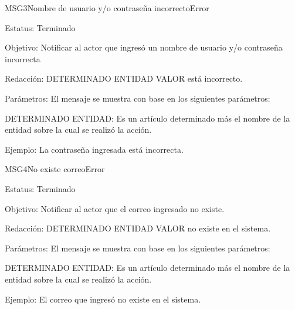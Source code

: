 \begin{mensaje}{MSG3}{Nombre de usuario y/o contraseña incorrecto}{Error}
	\item[Estatus:] Terminado
	\item[Objetivo:] Notificar al actor que ingresó un nombre de usuario y/o contraseña incorrecta
	\item[Redacción:] DETERMINADO ENTIDAD VALOR está incorrecto.
	\item[Parámetros:] El mensaje se muestra con base en los siguientes parámetros:
	\begin{Citemize}
		\item DETERMINADO ENTIDAD: Es un artículo determinado más el nombre de la entidad sobre la cual se realizó la acción.
	\end{Citemize}
	\item[Ejemplo:] La contraseña ingresada está incorrecta.
\end{mensaje}

\begin{mensaje}{MSG4}{No existe correo}{Error}
	\item[Estatus:] Terminado
	\item[Objetivo:] Notificar al actor que el correo ingresado no existe.
	\item[Redacción:] DETERMINADO ENTIDAD VALOR no existe en el sistema.
	\item[Parámetros:] El mensaje se muestra con base en los siguientes parámetros:
	\begin{Citemize}
		\item DETERMINADO ENTIDAD: Es un artículo determinado más el nombre de la entidad sobre la cual se realizó la acción.
	\end{Citemize}
	\item[Ejemplo:] El correo que ingresó no existe en el sistema.
\end{mensaje}

